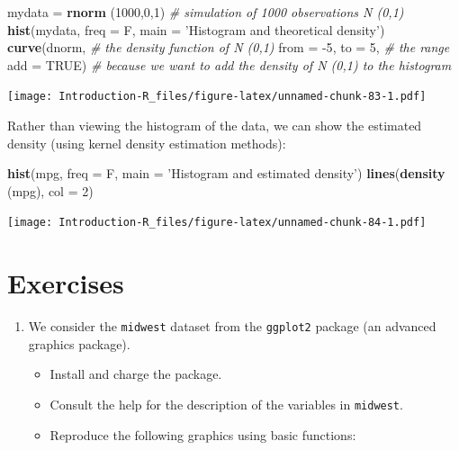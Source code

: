 \documentclass[]{book}
\newenvironment{Shaded}{\begin{snugshade}}{\end{snugshade}}
\newcommand{\CommentTok}[1]{\textcolor[rgb]{0.56,0.35,0.01}{\textit{#1}}}
\newcommand{\DataTypeTok}[1]{\textcolor[rgb]{0.13,0.29,0.53}{#1}}
\newcommand{\DecValTok}[1]{\textcolor[rgb]{0.00,0.00,0.81}{#1}}
\newcommand{\KeywordTok}[1]{\textcolor[rgb]{0.13,0.29,0.53}{\textbf{#1}}}
\newcommand{\NormalTok}[1]{#1}
\newcommand{\OtherTok}[1]{\textcolor[rgb]{0.56,0.35,0.01}{#1}}
\newcommand{\StringTok}[1]{\textcolor[rgb]{0.31,0.60,0.02}{#1}}
\providecommand{\tightlist}{%
  \setlength{\itemsep}{0pt}\setlength{\parskip}{0pt}}
\begin{document}
\begin{Shaded}
\begin{Highlighting}[]
\NormalTok{mydata =}\StringTok{ }\KeywordTok{rnorm}\NormalTok{ (}\DecValTok{1000}\NormalTok{,}\DecValTok{0}\NormalTok{,}\DecValTok{1}\NormalTok{) }\CommentTok{# simulation of 1000 observations N (0,1)}
\KeywordTok{hist}\NormalTok{(mydata, }\DataTypeTok{freq =}\NormalTok{ F, }\DataTypeTok{main =} \StringTok{'Histogram and theoretical density'}\NormalTok{)}
\KeywordTok{curve}\NormalTok{(dnorm, }\CommentTok{# the density function of N (0,1)}
      \DataTypeTok{from =} \DecValTok{-5}\NormalTok{, }\DataTypeTok{to =} \DecValTok{5}\NormalTok{, }\CommentTok{# the range}
      \DataTypeTok{add =} \OtherTok{TRUE}\NormalTok{) }\CommentTok{# because we want to add the density of N (0,1) to the histogram}
\end{Highlighting}
\end{Shaded}

\texttt{[image: Introduction-R\_files/figure-latex/unnamed-chunk-83-1.pdf]}

Rather than viewing the histogram of the data, we can show the estimated density (using kernel density estimation methods):

\begin{Shaded}
\begin{Highlighting}[]
\KeywordTok{hist}\NormalTok{(mpg, }\DataTypeTok{freq =}\NormalTok{ F, }\DataTypeTok{main =} \StringTok{'Histogram and estimated density'}\NormalTok{)}
\KeywordTok{lines}\NormalTok{(}\KeywordTok{density}\NormalTok{ (mpg), }\DataTypeTok{col =} \DecValTok{2}\NormalTok{)}
\end{Highlighting}
\end{Shaded}

\texttt{[image: Introduction-R\_files/figure-latex/unnamed-chunk-84-1.pdf]}

\hypertarget{exercises}{%
\section{Exercises}\label{exercises}}

\begin{enumerate}
\def\labelenumi{\arabic{enumi}.}
\tightlist
\item
  We consider the \texttt{midwest} dataset from the \texttt{ggplot2} package (an advanced graphics package).

  \begin{itemize}
  \tightlist
  \item
    Install and charge the package.
  \item
    Consult the help for the description of the variables in \texttt{midwest}.
  \item
    Reproduce the following graphics using basic functions:
  \end{itemize}
\end{enumerate}
\end{document}

